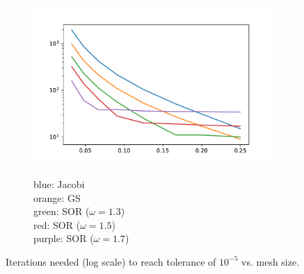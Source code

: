 \documentclass[10pt]{article}
\begin{document}
\begin{solution}[Solution]
\begin{figure}[H]\centering
    \begin{subfigure}{.6\textwidth}
        \includegraphics[width=\textwidth]{img/1/iter_vs_h.pdf}
    \end{subfigure}
    \begin{subfigure}{.25\textwidth}
        blue: Jacobi\\
        orange: GS \\
        green: SOR (\( \omega = 1.3 \)) \\
        red: SOR (\( \omega = 1.5 \)) \\
        purple: SOR (\( \omega = 1.7 \))
    \end{subfigure}

    \caption{Iterations needed (log scale) to reach tolerance of \( 10^{-5} \) vs. mesh size.}%
    \label{itervsh}
\end{figure}


\end{solution}
\end{document}
